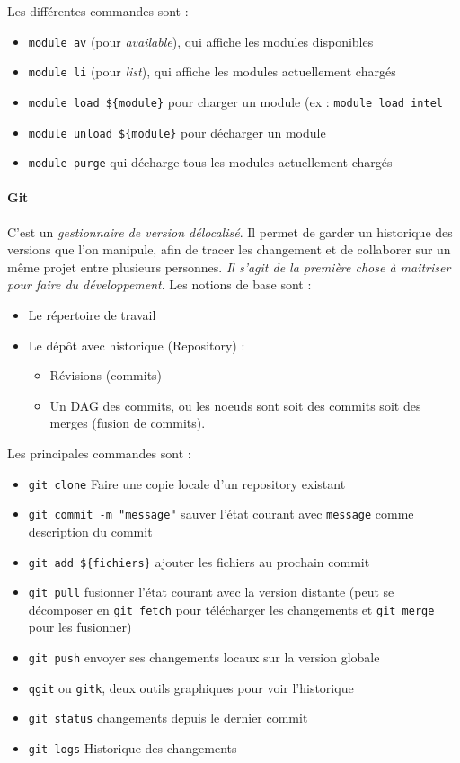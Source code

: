 \documentclass{article}
\begin{document}
Les différentes commandes sont :
\begin{itemize}[label=\textbullet]
\item \texttt{module av} (pour \textit{available}), qui affiche les modules disponibles
\item \texttt{module li} (pour \textit{list}), qui affiche les modules actuellement chargés
\item \texttt{module load \$\{module\}} pour charger un module (ex : \texttt{module load intel}
\item \texttt{module unload \$\{module\}} pour décharger un module
\item \texttt{module purge} qui décharge tous les modules actuellement chargés
\end{itemize}

\paragraph{Git}
C'est un \emph{gestionnaire de version délocalisé}. Il permet de garder un historique des versions que l'on manipule, afin de tracer les changement et de collaborer sur un même projet entre plusieurs personnes. \emph{Il s'agit de la première chose à maitriser pour faire du développement}. Les notions de base sont :
\begin{itemize}[label=\textbullet]
\item Le répertoire de travail
\item Le dépôt avec historique (Repository) :
\begin{itemize}
\item Révisions (commits)
\item Un DAG des commits, ou les noeuds sont soit des commits soit des merges (fusion de commits).
\end{itemize}
\end{itemize}
Les principales commandes sont :
\begin{itemize}
\item \texttt{git clone} Faire une copie locale d'un repository existant
\item \texttt{git commit -m "message"} sauver l'état courant avec \texttt{message} comme description du commit
\item \texttt{git add \$\{fichiers\}} ajouter les fichiers au prochain commit
\item \texttt{git pull} fusionner l'état courant avec la version distante (peut se décomposer en \texttt{git fetch} pour télécharger les changements et \texttt{git merge} pour les fusionner)
\item \texttt{git push} envoyer ses changements locaux sur la version globale
\item \texttt{qgit} ou \texttt{gitk}, deux outils graphiques pour voir l'historique 
\item \texttt{git status} changements depuis le dernier commit
\item \texttt{git logs} Historique des changements
\end{itemize}
\end{document}
